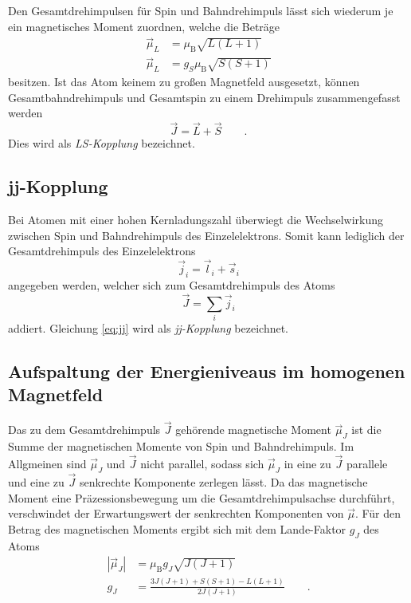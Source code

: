 Den Gesamtdrehimpulsen für Spin und Bahndrehimpuls lässt sich wiederum je ein magnetisches Moment zuordnen, welche die Beträge
\begin{align}
\vec{\mu}_L &= \mu_{\text{B}}\sqrt{L(L+1)} \\
\vec{\mu}_L &= g_S \mu_{\text{B}}\sqrt{S(S+1)}
\end{align}
besitzen. Ist das Atom keinem zu großen Magnetfeld ausgesetzt, können Gesamtbahndrehimpuls und Gesamtspin zu einem Drehimpuls zusammengefasst werden
\begin{equation}
\vec{J}=\vec{L}+\vec{S} \qquad .
\end{equation}
Dies wird als \textit{LS-Kopplung} bezeichnet.

\subsection*{jj-Kopplung}
Bei Atomen mit einer hohen Kernladungszahl überwiegt die Wechselwirkung zwischen Spin und Bahndrehimpuls des Einzelelektrons. Somit kann lediglich der Gesamtdrehimpuls des Einzelelektrons
\begin{equation}
\vec{j}_i = \vec{l}_i + \vec{s}_i
\end{equation}
angegeben werden, welcher sich zum Gesamtdrehimpuls des Atoms 
\begin{equation}
\vec{J} = \sum_i \vec{j}_i \label{eq:jj}
\end{equation}
addiert. Gleichung \eqref{eq:jj} wird als \textit{jj-Kopplung} bezeichnet.

\subsection{Aufspaltung der Energieniveaus im homogenen Magnetfeld}
Das zu dem Gesamtdrehimpuls $\vec{J}$ gehörende magnetische Moment $\vec{\mu}_J$ ist die Summe der magnetischen Momente von Spin und Bahndrehimpuls. Im Allgmeinen sind $\vec{\mu}_J$ und $\vec{J}$ nicht parallel, sodass sich $\vec{\mu}_J$ in eine zu $\vec{J}$ parallele
und eine zu $\vec{J}$ senkrechte Komponente zerlegen lässt. Da das magnetische Moment eine Präzessionsbewegung um die Gesamtdrehimpulsachse durchführt, verschwindet der Erwartungswert der senkrechten Komponenten von $\vec{\mu}$.
Für den Betrag des magnetischen Moments ergibt sich mit dem Lande-Faktor $g_J$ des Atoms
\begin{align}
|\vec{\mu}_J| &= \mu_\text{B}g_J\sqrt{J(J+1)} \\
g_J &= \frac{3J(J+1)+S(S+1)-L(L+1)}{2J(J+1)} \qquad \label{eq:lande} .
\end{align}

